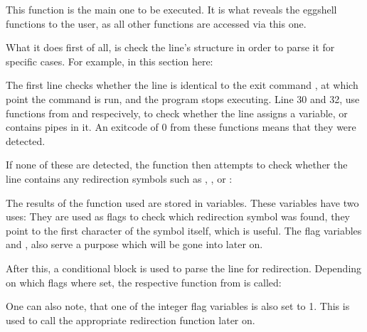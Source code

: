 \documentclass[12pt, a4paper]{report}
\begin{document}
                This function is the main one to be executed.
                It is what reveals the eggshell functions to the user,
                as all other functions are accessed via this one.

                What it does first of all, is check the line's structure
                in order to parse it for specific cases. For example, in 
                this section here:
                
                \begingroup
                \fontsize{10pt}{10pt}\selectfont
                \endgroup
                The first line checks whether the line is identical to the
                exit command , at which point the  command
                is run, and the program stops executing. Line 30 and 32, use
                functions from  and  respecively,
                to check whether the line assigns a variable, or contains pipes in it.
                An exitcode of 0 from these functions means that they were detected.

                If none of these are detected, the function then attempts to check
                whether the line contains any redirection symbols such as \tx{>},
                \tx{>>}, \tx{<} or \tx{<<<}:

                \begingroup
                \fontsize{10pt}{10pt}\selectfont
                \endgroup
                The results of the  function used are stored in variables.
                These variables have two uses: They are used as flags to check which
                redirection symbol was found,  they point to the first character
                of the symbol itself, which is useful. The flag variables  and
                , also serve a purpose which will be gone into later on.

                \clearpage

                After this, a conditional  block is used to parse the line
                for redirection. Depending on which  flags where set, the
                respective function from  is called:

                \begingroup
                \fontsize{10pt}{10pt}\selectfont
                \endgroup
                One can also note, that one of the integer flag variables  is
                also set to 1. This is used to call the appropriate redirection function
                later on.
\end{document}
